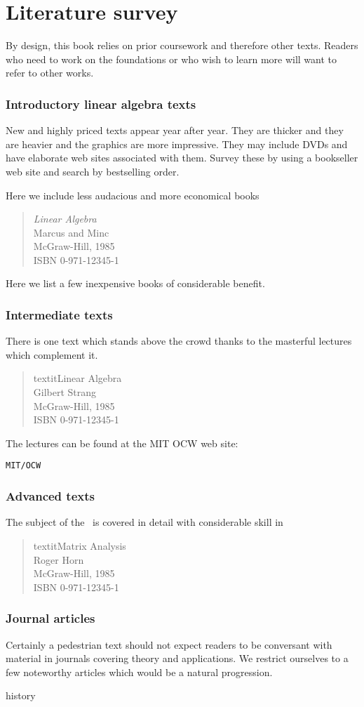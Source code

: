 \chapter*{Literature survey}

By design, this book relies on prior coursework and therefore other texts. Readers who need to work on the foundations or who wish to learn more will want to refer to other works.

\subsection*{Introductory linear algebra texts}
New and highly priced texts appear year after year. They are thicker and they are heavier and the graphics are more impressive. They may include DVDs and have elaborate web sites associated with them. Survey these by using a bookseller web site and search by bestselling order.

Here we include less audacious and more economical books
\begin{quote}
\textit{Linear Algebra}\\
Marcus and Minc\\
McGraw-Hill, 1985\\
ISBN 0-971-12345-1
\end{quote}

Here we list a few inexpensive books of considerable benefit. 

\subsection*{Intermediate texts}
There is one text which stands above the crowd thanks to the masterful lectures which complement it.
\begin{quote}
textit{Linear Algebra}\\
Gilbert Strang\\
McGraw-Hill, 1985\\
ISBN 0-971-12345-1
\end{quote}
The lectures can be found at the MIT OCW web site:
\begin{verbatim} 
MIT/OCW
\end{verbatim}

\subsection*{Advanced texts}
The subject of the \svdl \ is covered in detail with considerable skill in
\begin{quote}
textit{Matrix Analysis}\\
Roger Horn\\
McGraw-Hill, 1985\\
ISBN 0-971-12345-1
\end{quote}

\subsection*{Journal articles}
Certainly a pedestrian text should not expect readers to be conversant with material in journals covering theory and applications. We restrict ourselves to a few noteworthy articles which would be a natural progression.

history

\endinput